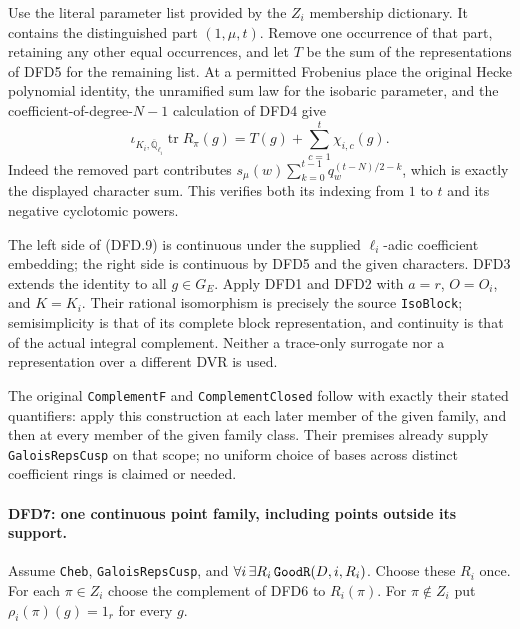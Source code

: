 \documentclass[11pt,a4paper]{article}
\numberwithin{equation}{section}
\theoremstyle{remark}\newtheorem{remark}[theorem]{Remark}
\begin{document}
Use the literal parameter list provided by the $Z_i$ membership
dictionary. It contains the distinguished part $(1,\mu,t)$.
Remove one occurrence of that part, retaining any other equal
occurrences, and let $T$ be the sum of the representations of
DFD5 for the remaining list. At a permitted Frobenius place the
original Hecke polynomial identity, the unramified sum law for
the isobaric parameter, and the coefficient-of-degree-$N-1$
calculation of DFD4 give
\[
 \iota_{K_i,\overline{\mathbb Q}_{\ell_i}}
            \operatorname{tr}R_\pi(g)
       =T(g)+\sum_{c=1}^{t}\chi_{i,c}(g).                \tag{DFD.9}
\]
Indeed the removed part contributes
$s_\mu(w)\sum_{k=0}^{t-1}q_w^{(t-N)/2-k}$, which is exactly
the displayed character sum. This verifies both its indexing
from $1$ to $t$ and its negative cyclotomic powers.

The left side of (DFD.9) is continuous under the supplied
$\ell_i$-adic coefficient embedding; the right side is
continuous by DFD5 and the given characters. DFD3 extends the
identity to all $g\in G_E$. Apply DFD1 and DFD2 with
$a=r$, $O=O_i$, and $K=K_i$. Their rational isomorphism is
precisely the source \texttt{Iso\allowbreak Block}; semisimplicity is that
of its complete block representation, and continuity is that
of the actual integral complement. Neither a trace-only
surrogate nor a representation over a different DVR is used.

The original \texttt{Complement\allowbreak F} and
\texttt{Complement\allowbreak Closed} follow with exactly their stated
quantifiers: apply this construction at each later member of
the given family, and then at every member of the given family
class. Their premises already supply \texttt{Galois\allowbreak Reps\allowbreak Cusp}
on that scope; no uniform choice of bases across distinct
coefficient rings is claimed or needed.

\paragraph{DFD7: one continuous point family, including points outside its support.}
\label{claim:DFD7}
Assume \texttt{Cheb}, \texttt{Galois\allowbreak Reps\allowbreak Cusp}, and
$\forall i\,\exists R_i\,\texttt{Good\allowbreak R}(D,i,R_i)$.
Choose these $R_i$ once. For each $\pi\in Z_i$ choose the
complement of DFD6 to $R_i(\pi)$. For $\pi\notin Z_i$ put
$\rho_i(\pi)(g)=1_r$ for every $g$.
\end{document}

